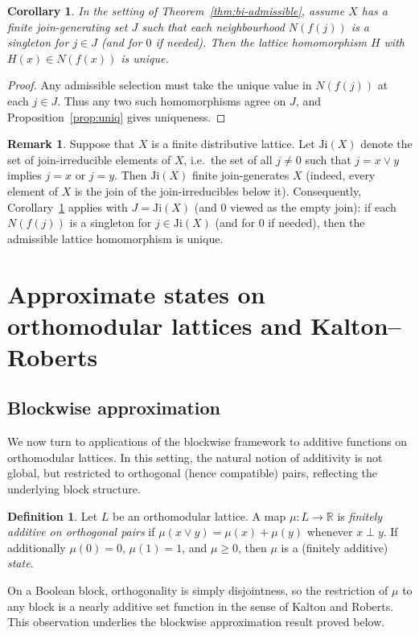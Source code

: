 \documentclass[11pt]{amsart}
\newtheorem{corollary}[theorem]{Corollary}
\theoremstyle{definition}
\newtheorem{definition}[theorem]{Definition}
\newtheorem{remark}[theorem]{Remark}
\newcommand{\join}{\vee}
\begin{document}
\begin{corollary}\label{cor:unique}
In the setting of Theorem~\ref{thm:bi-admissible}, assume $X$ has a finite join-generating set $J$ such that each neighbourhood $N(f(j))$ is a singleton for $j\in J$
(and for $0$ if needed).
Then the lattice homomorphism $H$ with $H(x)\in N(f(x))$ is unique.
\end{corollary}

\begin{proof}
Any admissible selection must take the unique value in $N(f(j))$ at each $j\in J$.
Thus any two such homomorphisms agree on $J$, and Proposition~\ref{prop:uniq} gives uniqueness.
\end{proof}

\begin{remark}
Suppose that $X$ is a finite distributive lattice.
Let $\mathrm{Ji}(X)$ denote the set of join-irreducible elements of $X$, i.e.\ the set of all $j\ne 0$ such that
$j=x\join y$ implies $j=x$ or $j=y$.
Then $\mathrm{Ji}(X)$ finite join-generates $X$ (indeed, every element of $X$ is the join of the join-irreducibles below it).
Consequently, Corollary~\ref{cor:unique} applies with $J=\mathrm{Ji}(X)$ (and $0$ viewed as the empty join):
if each $N(f(j))$ is a singleton for $j\in \mathrm{Ji}(X)$ (and for $0$ if needed), then the admissible lattice homomorphism is unique.
\end{remark}

\section{Approximate states on orthomodular lattices and Kalton--Roberts}

\subsection{Blockwise approximation}
We now turn to applications of the blockwise framework to additive functions on
orthomodular lattices.
In this setting, the natural notion of additivity is not global, but restricted to
orthogonal (hence compatible) pairs, reflecting the underlying block structure.

\begin{definition}
Let $L$ be an orthomodular lattice.
A map $\mu\colon L\to\mathbb{R}$ is \emph{finitely additive on orthogonal pairs} if $\mu(x\join y)=\mu(x)+\mu(y)$ whenever $x\perp y$.
If additionally $\mu(0)=0$, $\mu(1)=1$, and $\mu\ge 0$, then $\mu$ is a (finitely additive) \emph{state}.
\end{definition}
On a Boolean block, orthogonality is simply disjointness, so the restriction of $\mu$
to any block is a nearly additive set function in the sense of Kalton and Roberts.
This observation underlies the blockwise approximation result proved below.
\end{document}
